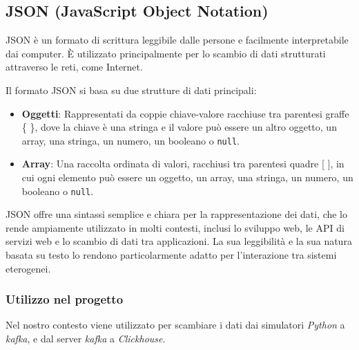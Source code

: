 \subsection{JSON (JavaScript Object Notation)}
JSON è un formato di scrittura leggibile dalle persone e facilmente interpretabile dai computer. È utilizzato principalmente per lo scambio di dati strutturati attraverso le reti, come Internet.

Il formato JSON si basa su due strutture di dati principali:

\begin{itemize}
  \item \textbf{Oggetti}: Rappresentati da coppie chiave-valore racchiuse tra parentesi graffe \{ \}, dove la chiave è una stringa e il valore può essere un altro oggetto, un array, una stringa, un numero, un booleano o \texttt{null}.
  \item \textbf{Array}: Una raccolta ordinata di valori, racchiusi tra parentesi quadre [ ], in cui ogni elemento può essere un oggetto, un array, una stringa, un numero, un booleano o \texttt{null}.
\end{itemize}

JSON offre una sintassi semplice e chiara per la rappresentazione dei dati, che lo rende ampiamente utilizzato in molti contesti, inclusi lo sviluppo web, le API di servizi web e lo scambio di dati tra applicazioni. La sua leggibilità e la sua natura basata su testo lo rendono particolarmente adatto per l'interazione tra sistemi eterogenei.
\subsubsection{Utilizzo nel progetto}
Nel nostro contesto viene utilizzato per scambiare i dati dai simulatori \textit{Python} a \textit{kafka}, e dal server \textit{kafka} a \textit{Clickhouse}.